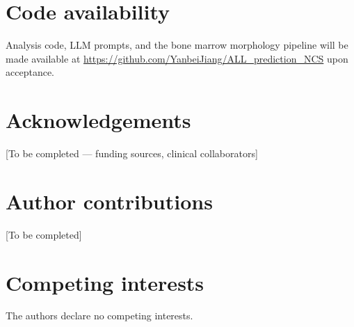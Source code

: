 \documentclass[pdflatex,sn-nature]{sn-jnl}
\begin{document}
\section*{Code availability}

Analysis code, LLM prompts, and the bone marrow morphology pipeline
will be made available at
\url{https://github.com/YanbeiJiang/ALL_prediction_NCS}
upon acceptance.

\section*{Acknowledgements}

[To be completed — funding sources, clinical collaborators]

\section*{Author contributions}

[To be completed]

\section*{Competing interests}

The authors declare no competing interests.

\end{document}
